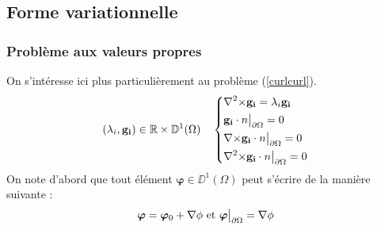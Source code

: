 \subsection{Forme variationnelle}
\label{fv}
\subsubsection{Problème aux valeurs propres}
\label{eigen}

On s'intéresse ici plus particulièrement au problème (\ref{curlcurl}).
\begin{equation}
\label{pbeigen}
(\lambda_i,\mathbf{g_i})\in{\mathbb{R}}\times {\mathbb{D}}^1(\Omega)\quad \left\{
\begin{aligned}
&{\nabla^2\times}  \mathbf{g_i} = \lambda_i \mathbf{g_i}\\
&\mathbf{g_i}\cdot n{\big\rvert_{\partial\Omega}} = 0\\
&{\nabla\times} \mathbf{g_i}\cdot n{\big\rvert_{\partial\Omega}} = 0\\
&{\nabla^2\times}  \mathbf{g_i}\cdot n{\big\rvert_{\partial\Omega}} = 0
\end{aligned}
\right.
\end{equation}
On note d'abord que tout élément $\bm{\varphi}\in \DD^1(\Omega)$ peut s'écrire de la manière suivante :
\[
\bm{\varphi} = \bm{\varphi}_0 + {\nabla}\phi\text{ et } \bm{\varphi}{\big\rvert_{\partial\Omega}} = {\nabla}\phi
\]

